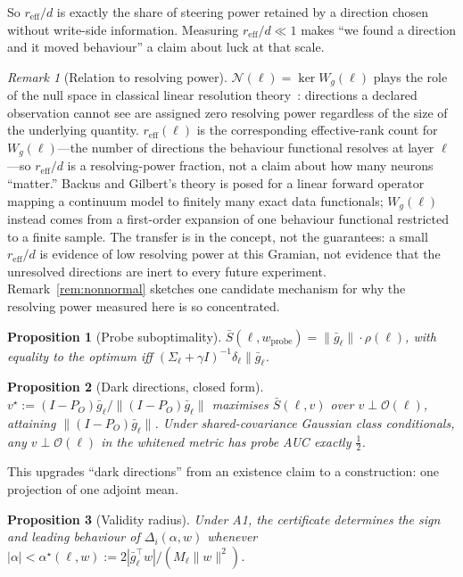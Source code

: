 \documentclass[11pt]{article}
\newtheorem{proposition}{Proposition}
\theoremstyle{definition}
\theoremstyle{remark}
\newtheorem{remark}{Remark}
\newcommand{\Sbar}{\bar{S}}
\newcommand{\gbar}{\bar{g}}
\newcommand{\Wg}{W_{g}}
\newcommand{\reff}{r_{\mathrm{eff}}}
\begin{document}
So $\reff/d$ is exactly the share of steering power retained by a direction
chosen without write-side information. Measuring $\reff/d\ll1$ makes ``we found
a direction and it moved behaviour'' a claim about luck at that scale.

\begin{remark}[Relation to resolving power]
\label{rem:resolution}
$\mathcal N(\ell)=\ker\Wg(\ell)$ plays the role of the null space in
classical linear resolution theory~\cite{backusgilbert1968}: directions a
declared observation cannot see are assigned zero resolving power regardless
of the size of the underlying quantity. $\reff(\ell)$ is the corresponding
effective-rank count for $\Wg(\ell)$---the number of directions the
behaviour functional resolves at layer $\ell$---so $\reff/d$ is a
resolving-power fraction, not a claim about how many neurons ``matter.''
Backus and Gilbert's theory is posed for a linear forward operator mapping a
continuum model to finitely many exact data functionals; $\Wg(\ell)$ instead
comes from a first-order expansion of one behaviour functional restricted to
a finite sample. The transfer is in the concept, not the guarantees: a small
$\reff/d$ is evidence of low resolving power at this Gramian, not evidence
that the unresolved directions are inert to every future experiment.
Remark~\ref{rem:nonnormal} sketches one candidate mechanism for why the
resolving power measured here is so concentrated.
\end{remark}

\begin{proposition}[Probe suboptimality]
$\Sbar(\ell,w_{\mathrm{probe}}) = \|\gbar_\ell\|\cdot\rho(\ell)$, with equality
to the optimum iff $(\Sigma_\ell+\gamma I)^{-1}\delta_\ell \parallel \gbar_\ell$.
\end{proposition}

\begin{proposition}[Dark directions, closed form]
\label{prop:dark}
$v^\star := (I-P_O)\gbar_\ell / \|(I-P_O)\gbar_\ell\|$ maximises $\Sbar(\ell,v)$
over $v\perp\mathcal{O}(\ell)$, attaining $\|(I-P_O)\gbar_\ell\|$. Under
shared-covariance Gaussian class conditionals, any $v\perp\mathcal{O}(\ell)$ in
the whitened metric has probe AUC exactly $\tfrac12$.
\end{proposition}

This upgrades ``dark directions'' from an existence claim to a construction: one
projection of one adjoint mean.

\begin{proposition}[Validity radius]
\label{prop:radius}
Under A1, the certificate determines the sign and leading behaviour of
$\Delta_i(\alpha,w)$ whenever
$|\alpha| < \alpha^\star(\ell,w) := 2|\gbar_\ell^\top w|/(M_\ell\|w\|^2)$.
\end{proposition}
\end{document}
